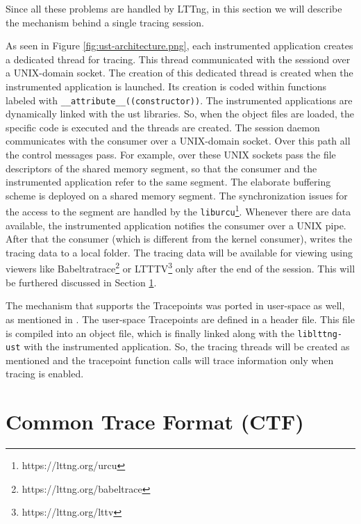 Since all these problems are handled by LTTng, in this section we will describe
the mechanism behind a single tracing session.


As seen in Figure \ref{fig:ust-architecture.png}, each instrumented application
creates a dedicated thread for tracing. This thread communicated with the
sessiond over a UNIX-domain socket. The creation of this dedicated thread is
created when the instrumented application is launched. Its creation is coded
within functions labeled with \texttt{\_\_attribute\_\_((constructor))}. The
instrumented applications are dynamically linked with the ust libraries. So,
when the object files are loaded, the specific code is executed and the threads
are created. The session daemon communicates with the consumer over a
UNIX-domain socket. Over this path all the control messages pass. For example,
over these UNIX sockets pass the file descriptors of the shared memory segment,
so that the consumer and the instrumented application refer to the same segment.
The elaborate buffering scheme is deployed on a shared memory segment. The
synchronization issues for the access to the segment are handled by the
\texttt{liburcu}\footnote{https://lttng.org/urcu}. Whenever there are data
available, the instrumented application notifies the consumer over a UNIX pipe.
After that the consumer (which is different from the kernel consumer), writes
the tracing data to a local folder. The tracing data will be available for
viewing using viewers like Babeltratrace\footnote{https://lttng.org/babeltrace}
or LTTTV\footnote{https://lttng.org/lttv} only after the end of the session.
This will be furthered discussed in Section \ref{sec:ctf}.

The mechanism that supports the Tracepoints was ported in user-space as well, as
mentioned in \cite{userspace-markers}. The user-space Tracepoints are defined in
a header file. This file is compiled into an object file, which is finally
linked along with the \texttt{liblttng-ust} with the instrumented application.
So, the tracing threads will be created as mentioned and the tracepoint function
calls will trace information only when tracing is enabled.

\section{Common Trace Format (CTF)}\label{sec:ctf}

